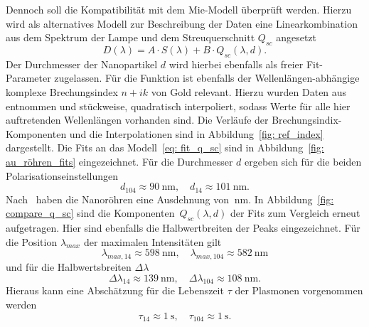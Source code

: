 Dennoch soll die Kompatibilität mit dem Mie-Modell überprüft werden. Hierzu wird als alternatives Modell zur Beschreibung der
Daten eine Linearkombination aus dem Spektrum der Lampe und dem Streuquerschnitt $Q_{sc}$ angesetzt
\begin{equation}
  D(\lambda) = A \cdot S(\lambda) + B \cdot Q_{sc}(\lambda, d).
  \label{eq: fit_q_sc}
\end{equation}
Der Durchmesser der Nanopartikel $d$ wird hierbei ebenfalls als freier Fit-Parameter zugelassen.
Für die Funktion ist ebenfalls der Wellenlängen-abhängige komplexe Brechungsindex $n + ik$ von Gold relevant. Hierzu wurden
Daten aus~\cite{ref_index_au} entnommen und stückweise, quadratisch interpoliert, sodass Werte für alle hier auftretenden Wellenlängen
vorhanden sind. Die Verläufe der Brechungsindix-Komponenten und die Interpolationen sind in Abbildung~\ref{fig: ref_index}
dargestellt. Die Fits an das Modell~\eqref{eq: fit_q_sc} sind in Abbildung~\ref{fig: au_röhren_fits} eingezeichnet.
Für die Durchmesser $d$ ergeben sich für die beiden Polarisationseinstellungen
\begin{equation}
  d_{104} \approx \SI{90}{\nano\meter}, \quad d_{14} \approx \SI{101}{\nano\meter}.
\end{equation}
Nach~\cite{anleitung} haben die Nanoröhren eine Ausdehnung von $\SI{}{\nano\meter}$.
In Abbildung~\ref{fig: compare_q_sc} sind die Komponenten~$Q_{sc}(\lambda, d)$ der Fits zum Vergleich erneut aufgetragen. Hier sind ebenfalls
die Halbwertbreiten der Peaks eingezeichnet. Für die Position $\lambda_{max}$ der maximalen Intensitäten gilt
\begin{equation}
  \lambda_{max, 14} \approx \SI{598}{\nano\meter}, \quad \lambda_{max, 104} \approx \SI{582}{\nano\meter}
\end{equation}
und für die Halbwertsbreiten $\Delta \lambda$
\begin{equation}
  \Delta \lambda_{14} \approx \SI{139}{\nano\meter}, \quad \Delta \lambda_{104} \approx \SI{108}{\nano\meter}.
\end{equation}
Hieraus kann eine Abschätzung für die Lebenszeit $\tau$ der Plasmonen vorgenommen werden
\begin{equation}
  \tau_{14} \approx \SI{1}{\second}, \quad   \tau_{104} \approx \SI{1}{\second}.
\end{equation}


